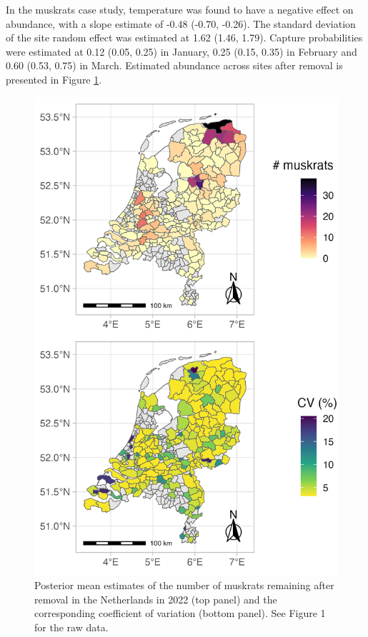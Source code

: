 \documentclass[
  11pt,
  a4paper,
]{article}
\begin{document}
In the muskrats case study, temperature was found to have a negative effect on abundance, with a slope estimate of -0.48 (-0.70, -0.26). The standard deviation of the site random effect was estimated at 1.62 (1.46, 1.79). Capture probabilities were estimated at 0.12 (0.05, 0.25) in January, 0.25 (0.15, 0.35) in February and 0.60 (0.53, 0.75) in March. Estimated abundance across sites after removal is presented in Figure \ref{fig:muskrats}.

\begin{figure}[H]

{\centering \includegraphics[width=0.85\linewidth]{muskrats} 

}

\caption{Posterior mean estimates of the number of muskrats remaining after removal in the Netherlands in 2022 (top panel) and the corresponding coefficient of variation (bottom panel). See Figure 1 for the raw data.}\label{fig:muskrats}
\end{figure}
\end{document}
